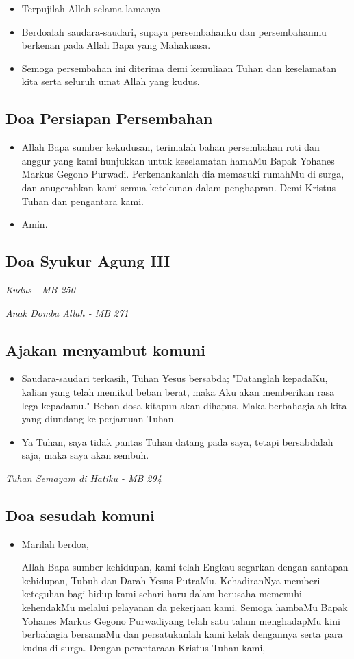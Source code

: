 \documentclass[10pt,landscape]{article}
\makeatletter
\newcommand{\lagu}[1]{%
  {\parindent \z@ 
    \interlinepenalty\@M \slshape \mdseries \large \textit{#1}\par\nobreak \vskip 10\p@ }}
\newcommand{\BU}[1]{\begin{itemize} \item[U:] #1 \end{itemize}}
\newcommand{\BI}[1]{\begin{itemize} \item[I:] #1 \end{itemize}}
\newcommand{\namaalm}{Bapak Yohanes Markus Gegono Purwadi}
\makeatother
\begin{document}
\begin{multicols}{3}
\BU{Terpujilah Allah selama-lamanya}

\BI{Berdoalah saudara-saudari, supaya persembahanku dan persembahanmu berkenan pada Allah Bapa yang Mahakuasa.}

\BU{Semoga persembahan ini diterima demi kemuliaan Tuhan dan keselamatan kita serta seluruh umat Allah yang kudus.}

\subsection*{Doa Persiapan Persembahan}

\BI{Allah Bapa sumber kekudusan, terimalah bahan persembahan roti dan anggur yang kami hunjukkan untuk keselamatan hamaMu \namaalm. Perkenankanlah dia memasuki rumahMu di surga, dan anugerahkan kami semua ketekunan dalam penghapran. Demi Kristus Tuhan dan pengantara kami.}

\BU{Amin.}


\subsection*{Doa Syukur Agung III}

\lagu{Kudus - MB 250}

\lagu{Anak Domba Allah - MB 271}

\subsection*{Ajakan menyambut komuni}

\BI{Saudara-saudari terkasih, Tuhan Yesus bersabda; "Datanglah kepadaKu, kalian yang telah memikul beban berat, maka Aku akan memberikan rasa lega kepadamu." Beban dosa kitapun akan dihapus. Maka berbahagialah kita yang diundang ke perjamuan Tuhan.}

\BU{Ya Tuhan, saya tidak pantas Tuhan datang pada saya, tetapi bersabdalah saja, maka saya akan sembuh.}

\lagu{Tuhan Semayam di Hatiku - MB 294}

\subsection*{Doa sesudah komuni}

\BI{Marilah berdoa,

Allah Bapa sumber kehidupan, kami telah Engkau segarkan dengan santapan kehidupan, Tubuh dan Darah Yesus PutraMu. KehadiranNya memberi keteguhan bagi hidup kami sehari-haru dalam berusaha memenuhi kehendakMu melalui pelayanan da  pekerjaan kami. Semoga hambaMu \namaalm yang telah satu tahun menghadapMu kini berbahagia bersamaMu dan persatukanlah kami kelak dengannya serta para kudus di surga. Dengan perantaraan Kristus Tuhan kami,}


\end{multicols}
\end{document}
